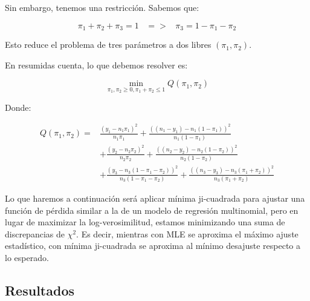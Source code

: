 Sin embargo, tenemos una restricción. Sabemos que:

\[
    \pi_1 + \pi_2 + \pi_3 = 1 \;\;\; => \;\;\; \pi_3 = 1 - \pi_1 - \pi_2
\]

Esto reduce el problema de tres parámetros a dos libres $(\pi_1, \pi_2)$. 

En resumidas cuenta, lo que debemos resolver es:

\[
    \min_{\pi_1, \pi_2 \geq0, \pi_1 + \pi_2 \leq 1} Q(\pi_1, \pi_2)
\]

Donde: 

\[
\begin{split}
Q(\pi_1, \pi_2) = & \frac{(y_1 - n_1 \pi_1)^2}{n_1 \pi_1} + \frac{((n_1 - y_1) - n_1(1 - \pi_1))^2}{n_1(1 - \pi_1)} \\
& + \frac{(y_2 - n_2 \pi_2)^2}{n_2 \pi_2} + \frac{((n_2 - y_2) - n_2(1 - \pi_2))^2}{n_2(1 - \pi_2)} \\
& + \frac{(y_3 - n_3(1 - \pi_1 - \pi_2))^2}{n_3(1 - \pi_1 - \pi_2)} + \frac{((n_3 - y_3) - n_3(\pi_1 + \pi_2))^2}{n_3(\pi_1 + \pi_2)}
\end{split}
\]

Lo que haremos a continuación será aplicar mínima ji-cuadrada para ajustar una función de pérdida similar
a la de un modelo de regresión multinomial, pero en lugar de maximizar la log-verosimilitud, estamos 
minimizando una suma de discrepancias de $\chi^2$. Es decir, mientras con MLE se aproxima el máximo 
ajuste estadístico, con mínima ji-cuadrada se aproxima al mínimo desajuste respecto a lo esperado. 

\subsection{Resultados}

